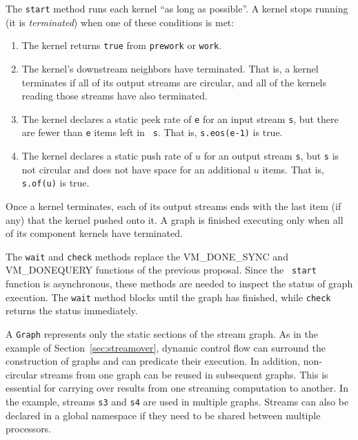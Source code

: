 The {\tt start} method runs each kernel ``as long as possible''.  A
kernel stops running (it is {\it terminated}) when one of these
conditions is met:
\begin{enumerate}

\item The kernel returns {\tt true} from {\tt prework} or {\tt work}.

\item The kernel's downstream neighbors have terminated.  That is, a
kernel terminates if all of its output streams are circular, and all
of the kernels reading those streams have also terminated.

\item The kernel declares a static peek rate of {\tt e} for an input
stream {\tt s}, but there are fewer than {\tt e} items left in {\tt
s}.  That is, {\tt s.eos(e-1)} is true.

\item The kernel declares a static push rate of $u$ for an output
stream {\tt s}, but {\tt s} is not circular and does not have space
for an additional $u$ items.  That is, {\tt s.of(u)} is true.

\end{enumerate}
Once a kernel terminates, each of its output streams ends with the
last item (if any) that the kernel pushed onto it.  A graph is
finished executing only when all of its component kernels have
terminated.

The {\tt wait} and {\tt check} methods replace the VM\_DONE\_SYNC and
VM\_DONEQUERY functions of the previous proposal.  Since the {\tt
start} function is asynchronous, these methods are needed to inspect
the status of graph execution.  The {\tt wait} method blocks until the
graph has finished, while {\tt check} returns the status immediately.


A {\tt Graph} represents only the static sections of the stream graph.
As in the example of Section~\ref{sec:streamover}, dynamic control
flow can surround the construction of graphs and can predicate their
execution.  In addition, non-circular streams from one graph can be
reused in subsequent graphs.  This is essential for carrying over
results from one streaming computation to another.  In the example,
streams {\tt s3} and {\tt s4} are used in multiple graphs.  Streams
can also be declared in a global namespace if they need to be shared
between multiple processors.

